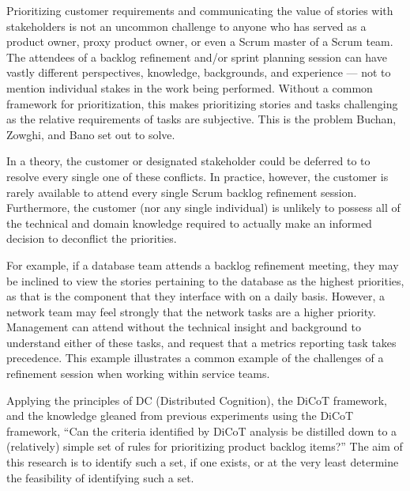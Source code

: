 Prioritizing customer requirements and communicating the value of stories with stakeholders is not an uncommon challenge to anyone who has served as a product owner, proxy product owner, or even a Scrum master of a Scrum team. The attendees of a backlog refinement and/or sprint planning session can have vastly different perspectives, knowledge, backgrounds, and experience --- not to mention individual stakes in the work being performed. Without a common framework for prioritization, this makes prioritizing stories and tasks challenging as the relative requirements of tasks are subjective. This is the problem Buchan, Zowghi, and Bano set out to solve.

In a theory, the customer or designated stakeholder could be deferred to to resolve every single one of these conflicts. In practice, however, the customer is rarely available to attend every single Scrum backlog refinement session. Furthermore, the customer (nor any single individual) is unlikely to possess all of the technical and domain knowledge required to actually make an informed decision to deconflict the priorities.

For example, if a database team attends a backlog refinement meeting, they may be inclined to view the stories pertaining to the database as the highest priorities, as that is the component that they interface with on a daily basis. However, a network team may feel strongly that the network tasks are a higher priority. Management can attend without the technical insight and background to understand either of these tasks, and request that a metrics reporting task takes precedence. This example illustrates a common example of the challenges of a refinement session
when working within service teams.

Applying the principles of DC (Distributed Cognition), the DiCoT framework, and the knowledge gleaned from previous experiments using the DiCoT framework, ``Can the criteria identified by DiCoT analysis be distilled down to a (relatively) simple set of rules for prioritizing product backlog items?'' The aim of this research is to identify such a set, if one exists, or at the very least determine the feasibility of identifying such a set.
